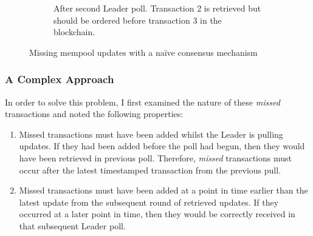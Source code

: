 \documentclass[12pt,a4paper,twoside,openright]{report}
\begin{document}
\begin{figure}
\begin{subfigure}[t]{0.45\textwidth}
			\caption{After second Leader poll. Transaction 2 is retrieved but should be ordered before transaction 3 in the blockchain.}
		\end{subfigure}
		\caption{Missing mempool updates with a na\"{i}ve consensus mechanism}	
		\label{fig:readremotepartudpatesbroke}
	\end{figure}
	\subsubsection*{A Complex Approach}
	In order to solve this problem, I first examined the nature of these \textit{missed} transactions and noted the following properties:
	\begin{enumerate}
		\item Missed transactions must have been added whilst the Leader is pulling updates. 
		If they had been added before the poll had begun, then they would have been retrieved in previous poll. 
		Therefore, \textit{missed} transactions must occur after the latest timestamped transaction from the previous pull. 
		\item Missed transactions must have been added at a point in time earlier than the latest update from the subsequent round of retrieved updates.
		If they occurred at a later point in time, then they would be correctly received in that subsequent Leader poll.
	\end{enumerate}
\end{document}
